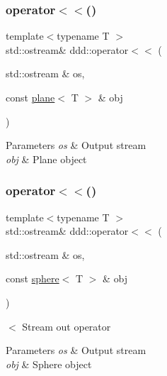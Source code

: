 \subsubsection{\texorpdfstring{operator$<$$<$()}{operator<<()}\hspace{0.1cm}{\footnotesize\ttfamily [9/10]}}
{\footnotesize\ttfamily template$<$typename T $>$ \\
std\+::ostream\& ddd\+::operator$<$$<$ (\begin{DoxyParamCaption}\item[{std\+::ostream \&}]{os,  }\item[{const \hyperlink{classddd_1_1plane}{plane}$<$ T $>$ \&}]{obj }\end{DoxyParamCaption})\hspace{0.3cm}{\ttfamily [inline]}}


\begin{DoxyParams}{Parameters}
{\em os} & Output stream \\
\hline
{\em obj} & Plane object \\
\hline
\end{DoxyParams}
\mbox{\label{namespaceddd_a64dbb41c0ee377eb528907f3448514f6}} 
\subsubsection{\texorpdfstring{operator$<$$<$()}{operator<<()}\hspace{0.1cm}{\footnotesize\ttfamily [10/10]}}
{\footnotesize\ttfamily template$<$typename T $>$ \\
std\+::ostream\& ddd\+::operator$<$$<$ (\begin{DoxyParamCaption}\item[{std\+::ostream \&}]{os,  }\item[{const \hyperlink{classddd_1_1sphere}{sphere}$<$ T $>$ \&}]{obj }\end{DoxyParamCaption})\hspace{0.3cm}{\ttfamily [inline]}}



$<$ Stream out operator 


\begin{DoxyParams}{Parameters}
{\em os} & Output stream \\
\hline
{\em obj} & Sphere object \\
\hline
\end{DoxyParams}
\mbox{\label{namespaceddd_a3c2355d52318b82d63a4ff3525bb651a}} 
